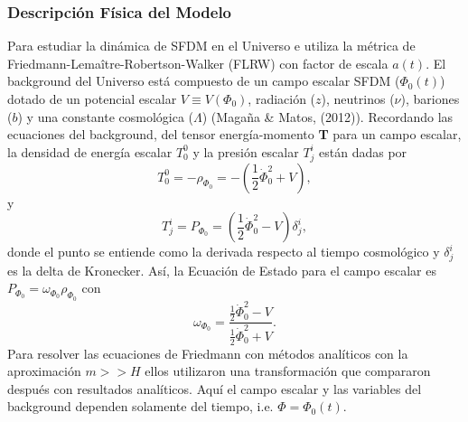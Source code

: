 \documentclass[a4paper,openright,12pt]{book}
\begin{document}
\subsubsection*{Descripción Física del Modelo}
Para estudiar la dinámica de SFDM en el Universo e utiliza la métrica de Friedmann-Lemaître-Robertson-Walker (FLRW) con factor de escala $a(t)$. El background del Universo está compuesto de un campo escalar SFDM ($\Phi_{0}(t)$) dotado de un potencial escalar $V \equiv V(\Phi_{0})$, radiación ($z$), neutrinos ($\nu$), bariones ($b$) y una constante cosmológica ($\Lambda$) (Magaña \& Matos, (2012)). Recordando las ecuaciones del background, del tensor energía-momento \textbf{T} para un campo escalar, la densidad de energía escalar $T_{0}^{0}$ y la presión escalar $T_{j}^{i}$ están dadas por
\begin{equation}
T_{0}^{0}=-\rho_{\Phi_{0}}=-\left(\frac{1}{2}\dot{\Phi}_{0}^{2} + V \right),\label{eqn 1.46}
\end{equation}
y
\begin{equation}
T_{j}^{i}=P_{\Phi_{0}}=\left(\frac{1}{2} \dot{\Phi}_{0}^{2}-V \right)\delta_{j}^{i},\label{eqn 1.47}
\end{equation}
donde el punto se entiende como la derivada respecto al tiempo cosmológico y $\delta_{j}^{i}$ es la delta de Kronecker. Así, la Ecuación de Estado para el campo escalar es $P_{\Phi_{0}}=\omega_{\Phi_{0}}\rho_{\Phi_{0}}$ con
\begin{equation}
\omega_{\Phi_{0}} = \frac{\frac{1}{2}\dot{\Phi}_{0}^{2}-V}{\frac{1}{2}\dot{\Phi}_{0}^{2}+V}.\label{eqn 1.48}
\end{equation}
Para resolver las ecuaciones de Friedmann con métodos analíticos con la aproximación $m >> H$ ellos utilizaron una transformación que compararon después con resultados analíticos. Aquí el campo escalar y las variables del background dependen solamente del tiempo, i.e. $\Phi=\Phi_{0}(t)$.
\end{document}
